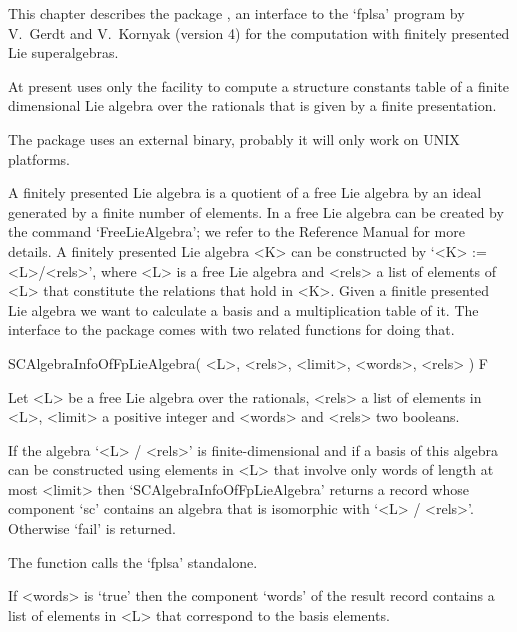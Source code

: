 

This chapter describes the {\GAP} package {\FPLSA} ,
an interface to the `fplsa' program by V.~Gerdt and V.~Kornyak (version 4)
for the computation with finitely presented Lie superalgebras.

At present {\GAP} uses only the facility to compute a structure constants
table of a finite dimensional Lie algebra over the rationals
that is given by a finite presentation.

The package uses an external binary,
probably it will only work on UNIX platforms. 



A finitely presented Lie algebra is a quotient of a free Lie algebra
by an ideal generated by a finite number of elements.
In {\GAP} a free Lie algebra can be created by the command `FreeLieAlgebra';
we refer to the {\GAP} Reference Manual for more details.
A finitely presented Lie algebra
<K> can be constructed by `<K> := <L>/<rels>', where <L> is a free Lie algebra
and <rels> a list of elements of <L> that constitute the relations 
that hold in <K>. Given a finitle presented Lie algebra we want to calculate 
a basis and a multiplication table of it. The interface to the {\FPLSA} 
package comes with two related functions for doing that. 

\>SCAlgebraInfoOfFpLieAlgebra( <L>, <rels>, <limit>, <words>, <rels> ) F

Let <L> be a free Lie algebra over the rationals,
<rels> a list of elements in <L>,
<limit> a positive integer 
and <words> and <rels> two booleans.

If the algebra `<L> / <rels>' is finite-dimensional and if a basis of
this algebra can be constructed using elements in <L> that involve only
words of length at most <limit> then `SCAlgebraInfoOfFpLieAlgebra'
returns a record whose component `sc' contains an algebra that is
isomorphic with `<L> / <rels>'.
Otherwise `fail' is returned.

The function calls the `fplsa' standalone.

If <words> is `true' then the component `words' of the result record
contains a list of elements in <L> that correspond to the basis elements.

